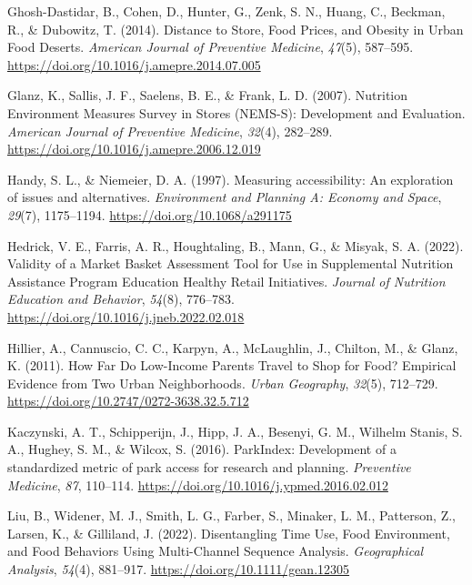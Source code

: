 \documentclass[
  letterpaper,
  number,
  review,
  doubleblind,
  3p]{elsarticle}
\newlength{\cslhangindent}
\newenvironment{CSLReferences}[2] %
 {\begin{list}{}{%
  \setlength{\itemindent}{0pt}
  \setlength{\leftmargin}{0pt}
  \setlength{\parsep}{0pt}
  \ifodd #1
   \setlength{\leftmargin}{\cslhangindent}
   \setlength{\itemindent}{-1\cslhangindent}
  \fi
  \setlength{\itemsep}{#2\baselineskip}}}
 {\end{list}}
\begin{document}
\begin{CSLReferences}{1}{0}
Ghosh-Dastidar, B., Cohen, D., Hunter, G., Zenk, S. N., Huang, C.,
Beckman, R., \& Dubowitz, T. (2014). Distance to {Store}, {Food Prices},
and {Obesity} in {Urban Food Deserts}. \emph{American Journal of
Preventive Medicine}, \emph{47}(5), 587--595.
\url{https://doi.org/10.1016/j.amepre.2014.07.005}

Glanz, K., Sallis, J. F., Saelens, B. E., \& Frank, L. D. (2007).
Nutrition {Environment Measures Survey} in {Stores} ({NEMS-S}):
{Development} and {Evaluation}. \emph{American Journal of Preventive
Medicine}, \emph{32}(4), 282--289.
\url{https://doi.org/10.1016/j.amepre.2006.12.019}

Handy, S. L., \& Niemeier, D. A. (1997). Measuring accessibility: {An}
exploration of issues and alternatives. \emph{Environment and Planning
A: Economy and Space}, \emph{29}(7), 1175--1194.
\url{https://doi.org/10.1068/a291175}

Hedrick, V. E., Farris, A. R., Houghtaling, B., Mann, G., \& Misyak, S.
A. (2022). Validity of a {Market Basket Assessment Tool} for {Use} in
{Supplemental Nutrition Assistance Program Education Healthy Retail
Initiatives}. \emph{Journal of Nutrition Education and Behavior},
\emph{54}(8), 776--783. \url{https://doi.org/10.1016/j.jneb.2022.02.018}

Hillier, A., Cannuscio, C. C., Karpyn, A., McLaughlin, J., Chilton, M.,
\& Glanz, K. (2011). How {Far Do Low-Income Parents Travel} to {Shop}
for {Food}? {Empirical Evidence} from {Two Urban Neighborhoods}.
\emph{Urban Geography}, \emph{32}(5), 712--729.
\url{https://doi.org/10.2747/0272-3638.32.5.712}

Kaczynski, A. T., Schipperijn, J., Hipp, J. A., Besenyi, G. M., Wilhelm
Stanis, S. A., Hughey, S. M., \& Wilcox, S. (2016). {ParkIndex}:
{Development} of a standardized metric of park access for research and
planning. \emph{Preventive Medicine}, \emph{87}, 110--114.
\url{https://doi.org/10.1016/j.ypmed.2016.02.012}

Liu, B., Widener, M. J., Smith, L. G., Farber, S., Minaker, L. M.,
Patterson, Z., Larsen, K., \& Gilliland, J. (2022). Disentangling {Time
Use}, {Food Environment}, and {Food Behaviors Using Multi-Channel
Sequence Analysis}. \emph{Geographical Analysis}, \emph{54}(4),
881--917. \url{https://doi.org/10.1111/gean.12305}


\end{CSLReferences}
\end{document}
